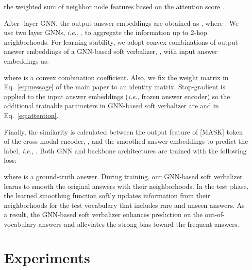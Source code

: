\documentclass[10pt,twocolumn,letterpaper]{article}
\begin{document}
the weighted sum of neighbor node features based on the attention score .

After -layer GNN, the output answer embeddings are obtained as , where .
We use two layer GNNs, \textit{i.e.}, , to aggregate the information up to 2-hop neighborhoods.
For learning stability, we adopt convex combinations of output answer embeddings of a GNN-based soft verbalizer, , with input answer embeddings  as:

where  is a convex combination coefficient.
Also, we fix the weight matrix  in Eq.~\eqref{eq:message} of the main paper to an identity matrix.
Stop-gradient is applied to the input answer embeddings (\textit{i.e.}, frozen answer encoder) so the additional trainable parameters in GNN-based soft verbalizer are  and  in Eq.~\eqref{eq:attention}.

Finally, the similarity is calculated between the output feature of [MASK] token of the cross-modal encoder, , and the smoothed answer embeddings  to predict the label, \textit{i.e.}, .
Both GNN and backbone architectures are trained with the following loss:

where  is a ground-truth answer.
During training, our GNN-based soft verbalizer learns to smooth the original answers with their neighborhoods.
In the test phase, the learned smoothing function softly updates information from their neighborhoods for the test vocabulary that includes rare and unseen answers.
As a result, the GNN-based soft verbalizer enhances prediction on the out-of-vocabulary answers and alleviates the strong bias toward the frequent answers.  \section{Experiments}
\end{document}
